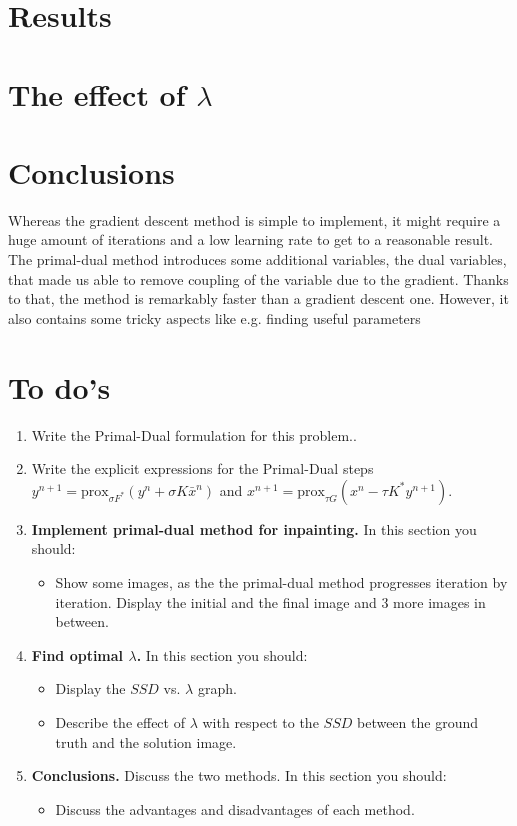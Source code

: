 \documentclass{paper}
\begin{document}
\section{Results}
\section{The effect of $\lambda$}
\section{Conclusions}
Whereas the gradient descent method is simple to implement, it might require a huge amount of iterations and a low learning rate to get to a reasonable result. 
The primal-dual method introduces some additional variables, the dual variables, that made us able to remove coupling of the variable due to the gradient. Thanks to that, the method is remarkably faster than a gradient descent one. However, it also contains some tricky aspects like e.g. finding useful parameters

\section{To do's}
\begin{enumerate}
\item Write the Primal-Dual formulation for this problem..

\item Write the explicit expressions for the Primal-Dual steps $y^{n+1} = \text{prox}_{\sigma F^*} (y^n + \sigma K \bar{x}^n)$ and $x^{n+1} = \text{prox}_{\tau G} (x^n  - \tau K^* y^{n+1})$.


\item \textbf{Implement primal-dual method for inpainting.} In this section you should:

\begin{itemize}
\item Show some images, as the the primal-dual method progresses iteration by iteration. Display the initial and the final image and 3 more images in between.
\end{itemize}
\item \textbf{ Find optimal $\lambda$.} In this section you should:

\begin{itemize}
\item Display the $SSD$ vs. $\lambda$ graph.
\item Describe the effect of $\lambda$ with respect to the $SSD$ between the ground truth and the solution image.
\end{itemize}

\item \textbf{ Conclusions.} Discuss the two methods. In this section you should:
\begin{itemize}
\item Discuss the advantages and disadvantages of each method.
\end{itemize}
\end{enumerate}


\nocite{*}


 
\end{document}
